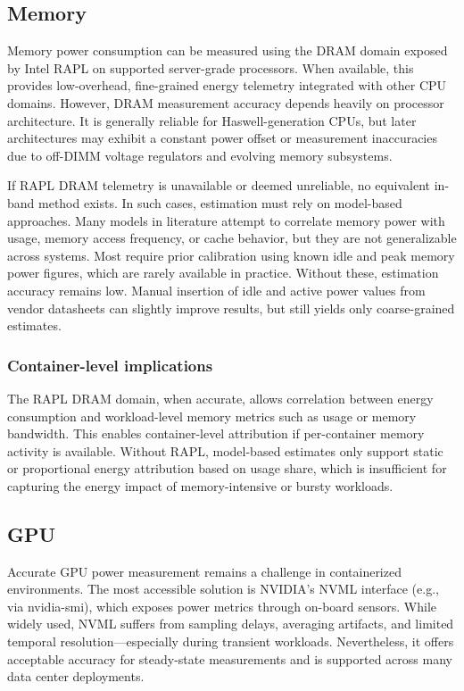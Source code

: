 \subsection{Memory}

Memory power consumption can be measured using the DRAM domain exposed by Intel RAPL on supported server-grade processors. When available, this provides low-overhead, fine-grained energy telemetry integrated with other CPU domains. However, DRAM measurement accuracy depends heavily on processor architecture. It is generally reliable for Haswell-generation CPUs, but later architectures may exhibit a constant power offset or measurement inaccuracies due to off-DIMM voltage regulators and evolving memory subsystems.

If RAPL DRAM telemetry is unavailable or deemed unreliable, no equivalent in-band method exists. In such cases, estimation must rely on model-based approaches. Many models in literature attempt to correlate memory power with usage, memory access frequency, or cache behavior, but they are not generalizable across systems. Most require prior calibration using known idle and peak memory power figures, which are rarely available in practice. Without these, estimation accuracy remains low. Manual insertion of idle and active power values from vendor datasheets can slightly improve results, but still yields only coarse-grained estimates.

\subsubsection{Container-level implications}
The RAPL DRAM domain, when accurate, allows correlation between energy consumption and workload-level memory metrics such as usage or memory bandwidth. This enables container-level attribution if per-container memory activity is available. Without RAPL, model-based estimates only support static or proportional energy attribution based on usage share, which is insufficient for capturing the energy impact of memory-intensive or bursty workloads.

\subsection{GPU}

Accurate GPU power measurement remains a challenge in containerized environments. The most accessible solution is NVIDIA’s NVML interface (e.g., via nvidia-smi), which exposes power metrics through on-board sensors. While widely used, NVML suffers from sampling delays, averaging artifacts, and limited temporal resolution—especially during transient workloads. Nevertheless, it offers acceptable accuracy for steady-state measurements and is supported across many data center deployments.

